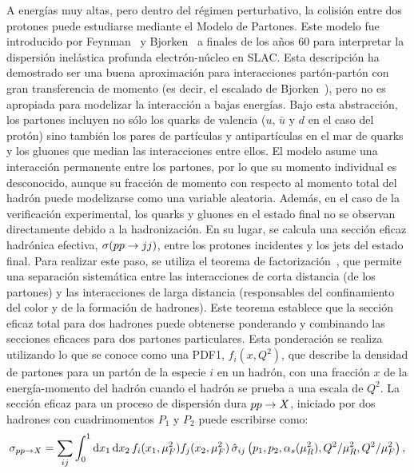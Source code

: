 A energías muy altas, pero dentro del régimen perturbativo, la colisión entre dos protones puede estudiarse mediante el Modelo de Partones. Este modelo fue introducido por Feynman~\cite{Feynman-1969} y Bjorken~\cite{Bjorken-1969_1} a finales de los años 60 para interpretar la dispersión inelástica profunda electrón-núcleo en SLAC. Esta descripción ha demostrado ser una buena aproximación para interacciones partón-partón con gran transferencia de momento (es decir, el escalado de Bjorken~\cite{Bjorken-1969_2}), pero no es apropiada para modelizar la interacción a bajas energías.
Bajo esta abstracción, los partones incluyen no sólo los quarks de valencia (\(u\), \(\bar{u}\) y \(d\) en el caso del protón) sino también los pares de partículas y antipartículas en el mar de quarks y los gluones que median las interacciones entre ellos. El modelo asume una interacción permanente entre los partones, por lo que su momento individual es desconocido, aunque su fracción de momento con respecto al momento total del hadrón puede modelizarse como una variable aleatoria.
Además, en el caso de la verificación experimental, los quarks y gluones en el estado final no se observan directamente debido a la hadronización. En su lugar, se calcula una sección eficaz hadrónica efectiva, \(\sigma(pp\rightarrow jj)\), entre los protones incidentes y los jets del estado final. Para realizar este paso, se utiliza el teorema de factorización~\cite{Ellis_Georgi_Politzer_Ross-1978,Feynman-1969,Collins_Soper_Sterman-book,Collins_Soper-1987}, que permite una separación sistemática entre las interacciones de corta distancia (de los partones) y las interacciones de larga distancia (responsables del confinamiento del color y de la formación de hadrones). Este teorema establece que la sección eficaz total para dos hadrones puede obtenerse ponderando y combinando las secciones eficaces para dos partones particulares. Esta ponderación se realiza utilizando lo que se conoce como una \ac{PDF1}, \(f_i(x,Q^2)\), que describe la densidad de partones para un partón de la especie \(i\) en un hadrón, con una fracción \(x\) de la energía-momento del hadrón cuando el hadrón se prueba a una escala de \(Q^2\). La sección eficaz para un proceso de dispersión dura \(pp \rightarrow X\), iniciado por dos hadrones con cuadrimomentos \(P_1\) y \(P_2\) puede escribirse como:
\begin{equation}
    \label{eq:theory:sm:hadron_interactions:xs}
    \sigma_{pp\rightarrow X} = \sum_{ij} \int_0^1 \dd{x_1} \dd{x_2} f_i(x_1, \mu_F^2) f_j(x_2, \mu_F^2) \, \hat{\sigma}_{ij}\left(p_1, p_2, \alpha_s(\mu_R^2), Q^2/\mu_R^2, Q^2/\mu_F^2 \right),
\end{equation}
